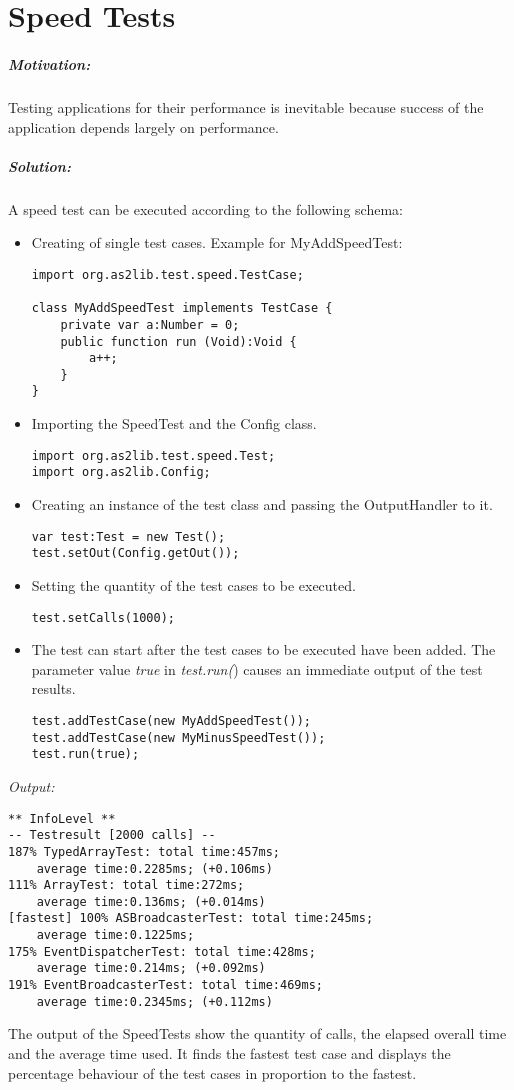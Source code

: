 \chapter{Speed Tests}
\label{sec:SpeedTests}

\paragraph{Motivation:}
Testing applications for their performance is inevitable because success of the application depends largely on performance.

\paragraph{Solution:}
A speed test can be executed according to the following schema:
\begin{itemize}
	\item Creating of single test cases.
	Example for MyAddSpeedTest:
\begin{lstlisting}[frame=single]
import org.as2lib.test.speed.TestCase;

class MyAddSpeedTest implements TestCase {
	private var a:Number = 0;
	public function run (Void):Void {
		a++;
	}
}
\end{lstlisting}
	\item Importing the SpeedTest and the Config class.
\begin{lstlisting}[frame=single]
import org.as2lib.test.speed.Test;
import org.as2lib.Config;
\end{lstlisting}
	\item Creating an instance of the test class and passing the OutputHandler to it.
\begin{lstlisting}[frame=single]
var test:Test = new Test();
test.setOut(Config.getOut());
\end{lstlisting}
	\item Setting the quantity of the test cases to be executed.
\begin{lstlisting}[frame=single]
test.setCalls(1000);
\end{lstlisting}
	\item The test can start after the test cases to be executed have been added. The parameter value \emph{true} in \emph{test.run(}) causes an immediate output of the test results.
\begin{lstlisting}[frame=single]
test.addTestCase(new MyAddSpeedTest());
test.addTestCase(new MyMinusSpeedTest());
test.run(true);
\end{lstlisting}
\end{itemize}
\clearpage
\emph{Output:}
\begin{lstlisting}[frame=single]
** InfoLevel **
-- Testresult [2000 calls] --
187% TypedArrayTest: total time:457ms; 
	average time:0.2285ms; (+0.106ms)
111% ArrayTest: total time:272ms; 
	average time:0.136ms; (+0.014ms)
[fastest] 100% ASBroadcasterTest: total time:245ms; 
	average time:0.1225ms;
175% EventDispatcherTest: total time:428ms; 
	average time:0.214ms; (+0.092ms)
191% EventBroadcasterTest: total time:469ms; 
	average time:0.2345ms; (+0.112ms)
\end{lstlisting}

The output of the SpeedTests show the quantity of calls, the elapsed overall time and the average time used. It finds the fastest test case and displays the percentage behaviour of the test cases in proportion to the fastest.
